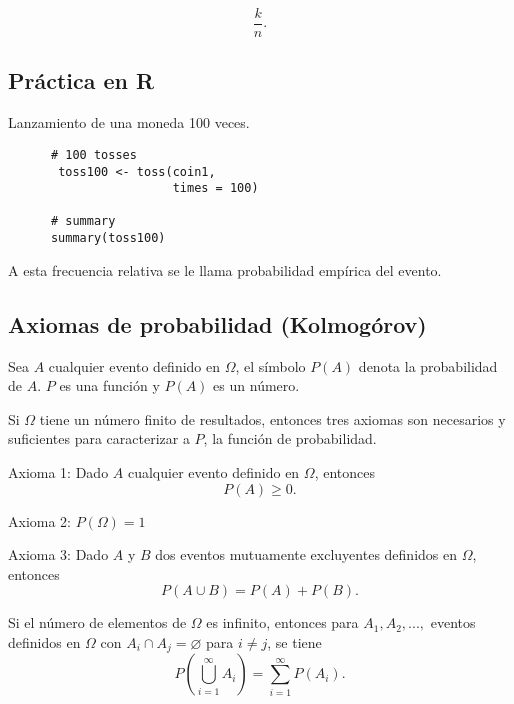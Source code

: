\begin{equation*}
\frac{k}{n}.
\end{equation*}

\subsection{Práctica en R} 


Lanzamiento de una moneda 100 veces.
\begin{lstlisting}
      # 100 tosses
       toss100 <- toss(coin1,
                       times = 100)

      # summary
      summary(toss100)
\end{lstlisting}
A esta frecuencia relativa se le llama probabilidad empírica del evento.


\subsection{Axiomas de probabilidad (Kolmogórov)} 

Sea $A$ cualquier evento definido en $\Omega$, el símbolo $P(A)$ denota la probabilidad de $A$. $P$ es una función y $P(A)$ es un número.

Si $\Omega$ tiene un número finito de resultados, entonces tres axiomas son necesarios y suficientes para caracterizar a $P$, la función de probabilidad.

Axioma 1:
Dado $A$ cualquier evento definido en $\Omega$, entonces 
\begin{equation*}
P(A)\geq 0.
\end{equation*}

Axioma 2:
$P(\Omega)=1$

Axioma 3:
Dado $A$ y $B$ dos eventos mutuamente excluyentes definidos en $\Omega$, entonces 
\begin{equation*}
P(A\cup B)=P(A)+P(B).
\end{equation*}


Si el número de elementos de $\Omega$ es infinito, entonces para $A_{1},A_{2},...,$ eventos definidos en $\Omega$ con $A_{i}\cap A_{j}=\varnothing$ para $i\neq j$, se tiene
\begin{equation*}
P\left( \bigcup\limits_{i=1}^{\infty }A_{i}\right) =\sum_{i=1}^{\infty}P(A_{i}).
\end{equation*}

